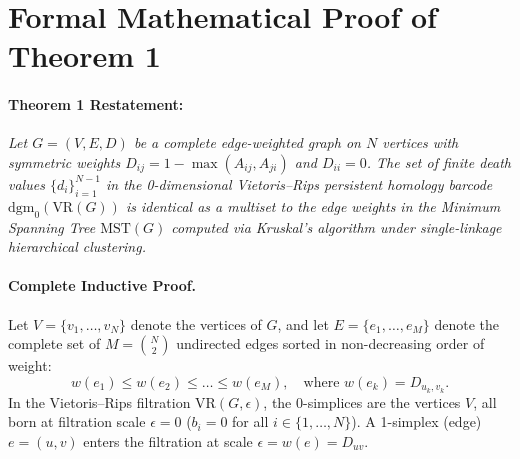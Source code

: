 \documentclass{article}
\begin{document}
\section{Formal Mathematical Proof of Theorem 1}
\label{app:proof}
\paragraph{Theorem 1 Restatement:} \textit{Let $G = (V, E, D)$ be a complete edge-weighted graph on $N$ vertices with symmetric weights $D_{ij} = 1 - \max(A_{ij}, A_{ji})$ and $D_{ii} = 0$. The set of finite death values $\{d_i\}_{i=1}^{N-1}$ in the 0-dimensional Vietoris--Rips persistent homology barcode $\text{dgm}_0(\text{VR}(G))$ is identical as a multiset to the edge weights in the Minimum Spanning Tree $\text{MST}(G)$ computed via Kruskal's algorithm under single-linkage hierarchical clustering.}

\paragraph{Complete Inductive Proof.}
Let $V = \{v_1, \dots, v_N\}$ denote the vertices of $G$, and let $E = \{e_1, \dots, e_M\}$ denote the complete set of $M = \binom{N}{2}$ undirected edges sorted in non-decreasing order of weight:
\begin{equation}
    w(e_1) \le w(e_2) \le \dots \le w(e_M), \quad \text{where } w(e_k) = D_{u_k, v_k}.
\end{equation}
In the Vietoris--Rips filtration $\text{VR}(G, \epsilon)$, the $0$-simplices are the vertices $V$, all born at filtration scale $\epsilon = 0$ ($b_i = 0$ for all $i \in \{1, \dots, N\}$). A 1-simplex (edge) $e = (u, v)$ enters the filtration at scale $\epsilon = w(e) = D_{uv}$.
\end{document}
